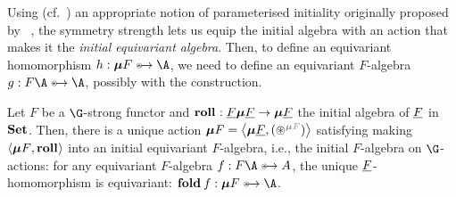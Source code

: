Using (cf.~) an
appropriate notion of parameterised initiality originally proposed by
\citeauthor{bird-paterson:generalised-folds-for-nested-datatypes}~\cite{%
  bird-paterson:generalised-folds-for-nested-datatypes},
the symmetry strength lets us equip the initial algebra with an action
that makes it the \emph{initial equivariant algebra}. Then, to define
an equivariant homomorphism $h : \fix F \equito \A$, we need to define
an equivariant $F$-algebra $g : F\A \equito \A$, possibly with
the \WLOG construction.

\begin{theorem}
  Let $F$ be a $\G$-strong functor and $\roll : \carrier F\fix
  \carrier F \to \fix \carrier F$ the initial algebra of $\underline{F}$ in ${\mathbf{ Set}}$.
  Then, there is a unique action $\fix F = \pair{\fix \carrier F}{(\act[\fix F])}$ satisfying
  making $\pair{\fix F}\roll$ into an initial equivariant $F$-algebra, i.e., the initial $F$-algebra on $\G$-actions:
  for any equivariant $F$-algebra ${f : F\A \equito A}$, the unique
  $\underline{F}$-homomorphism is equivariant: $\fold f : \fix F \equito
  \A$.
\end{theorem}

